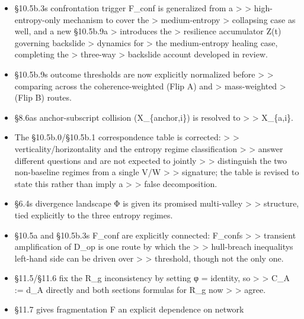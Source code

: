 \documentclass[
]{article}
\begin{document}
\begin{itemize}
  contradicting \textgreater{} \textgreater{} §10.5b.8s explicit
  coherence/dissipation account for that same \textgreater{}
  \textgreater{} regime. It now uses the coherence account consistently.
\item
  §10.5b.3s confrontation trigger F\_conf is generalized from a
  \textgreater{} \textgreater{} high-entropy-only mechanism to cover the
  \textgreater{} medium-entropy \textgreater{} collapsing case as well,
  and a new §10.5b.9a \textgreater{} introduces the \textgreater{}
  resilience accumulator Z(t) governing backslide \textgreater{}
  dynamics for \textgreater{} the medium-entropy healing case,
  completing the \textgreater{} three-way \textgreater{} backslide
  account developed in review.
\item
  §10.5b.9s outcome thresholds are now explicitly normalized before
  \textgreater{} \textgreater{} comparing across the coherence-weighted
  (Flip A) and \textgreater{} mass-weighted \textgreater{} (Flip B)
  routes.
\item
  §8.6as anchor-subscript collision (X\_\{anchor,i\}) is resolved to
  \textgreater{} \textgreater{} X\_\{a,i\}.
\item
  The §10.5b.0/§10.5b.1 correspondence table is corrected:
  \textgreater{} \textgreater{} verticality/horizontality and the
  entropy regime classification \textgreater{} \textgreater{} answer
  different questions and are not expected to jointly \textgreater{}
  \textgreater{} distinguish the two non-baseline regimes from a single
  V/W \textgreater{} \textgreater{} signature; the table is revised to
  state this rather than imply a \textgreater{} \textgreater{} false
  decomposition.
\item
  §6.4s divergence landscape Φ is given its promised multi-valley
  \textgreater{} \textgreater{} structure, tied explicitly to the three
  entropy regimes.
\item
  §10.5a and §10.5b.3s F\_conf are explicitly connected: F\_confs
  \textgreater{} \textgreater{} transient amplification of D\_op is one
  route by which the \textgreater{} \textgreater{} hull-breach
  inequalitys left-hand side can be driven over \textgreater{}
  \textgreater{} threshold, though not the only one.
\item
  §11.5/§11.6 fix the R\_g inconsistency by setting φ = identity, so
  \textgreater{} \textgreater{} C\_A := d\_A directly and both sections
  formulas for R\_g now \textgreater{} \textgreater{} agree.
\item
  §11.7 gives fragmentation F an explicit dependence on network

\end{itemize}
\end{document}
